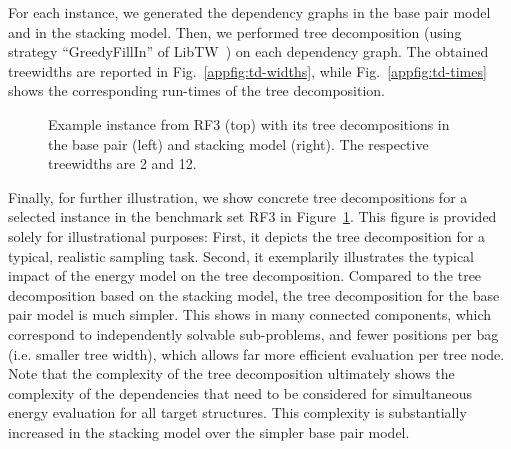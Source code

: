 \documentclass[10pt]{article}
\makeatletter
\newlength{\@aligneps}
\newcommand{\includegraphicstop}[2][]{%
\sbox{\@alignepsbox}{\texttt{[image: \#2]}}%
\setlength{\@aligneps}{-\ht\@alignepsbox}%
\addtolength{\@aligneps}{2ex}%
\raisebox{\@aligneps}{\usebox{\@alignepsbox}}}
\newcommand{\citep}[1]{\cite{#1}}
\newcommand{\revised}[1]{{\color{red} #1}}
\makeatother
\begin{document}
For each instance, we generated the dependency graphs in the base pair
model and in the stacking model. Then, we performed tree decomposition
(using strategy ``GreedyFillIn'' of LibTW~\citep{Dijk2006}) on each dependency
graph. The obtained treewidths are reported in
Fig.~\ref{appfig:td-widths}, while Fig.~\ref{appfig:td-times} shows the
corresponding run-times of the tree decomposition.


\begin{figure}[h!]
  \centering
  {\small }
  \includegraphicstop[width=0.55\textwidth]{Figs/td-example-basepair}%
  \includegraphicstop[width=0.30\textwidth]{Figs/td-example-stacking}
  \caption{Example instance from RF3 (top) with its tree decompositions in the base pair (left) and stacking model (right). The respective treewidths are 2 and 12.}
  \label{appfig:td-example}
\end{figure}

\revised{
  Finally, for further illustration, we show concrete tree decompositions for a selected instance in the benchmark set RF3 in Figure~\ref{appfig:td-example}. This figure is provided solely for illustrational purposes:
  First, it depicts the tree decomposition for a typical, realistic sampling task. Second, it exemplarily illustrates the typical impact of the energy model on the tree decomposition.
  Compared to the tree decomposition based on the stacking model, the tree decomposition for the base pair model is much simpler. This shows in many connected components, which correspond to independently solvable sub-problems, and fewer positions per bag (i.e. smaller tree width), which allows far more efficient evaluation per tree node. 
  Note that the complexity of the tree decomposition ultimately shows the complexity of the dependencies that need to be considered for simultaneous energy evaluation for all target structures. This complexity is substantially increased in the stacking model over the simpler base pair model.
}
\end{document}
